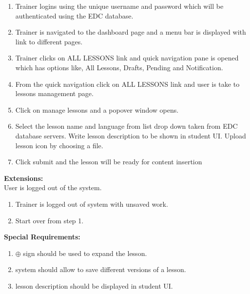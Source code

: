 \documentclass{report}
\begin{document}
\begin{enumerate}
    \item Trainer logins using the unique username and password which will be authenticated using the EDC database.
    \item Trainer is navigated to the dashboard page and a menu bar is displayed with link to different pages.
    \item Trainer clicks on ALL LESSONS link and quick navigation pane is opened which has options like, All Lessons, Drafts, Pending and Notification.
    \item From the quick navigation click on ALL LESSONS link and user is take to lessons management page.
    \item Click on manage lessons and a popover window opens.
    \item Select the lesson name and language from list drop down taken from EDC database servers. Write lesson description to be shown in student UI. Upload lesson icon by choosing a file.
    \item Click submit and the lesson will be ready for content insertion
    
\end{enumerate}
\textbf{Extensions:}\\
User is logged out of the system.
\begin{enumerate}
    \item Trainer is logged out of system with unsaved work.
    \item Start over from step 1.
\end{enumerate}
\textbf{Special Requirements:}
\begin{enumerate}
    \item $\oplus$ sign should be used to expand the lesson.
    \item system should allow to save different versions of a lesson.
    \item lesson description should be displayed in student UI.
\end{enumerate}
\end{document}
